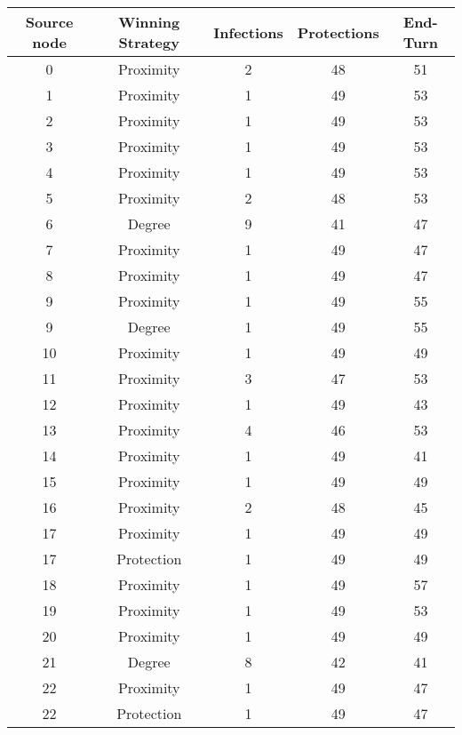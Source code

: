 \documentclass[results.tex]{subfiles}
\begin{document}
\begin{center}
  \begin{tabular}{| c || c | c | c | c |}
    \hline
    {\bfseries Source node} & {\bfseries Winning Strategy} & {\bfseries Infections} & {\bfseries Protections} & {\bfseries End-Turn} \\  %
    \hline\hline
    0 & Proximity & 2 & 48 & 51 \\ 
    \hline
    1 & Proximity & 1 & 49 & 53 \\ 
    \hline
    2 & Proximity & 1 & 49 & 53 \\ 
    \hline
    3 & Proximity & 1 & 49 & 53 \\ 
    \hline
    4 & Proximity & 1 & 49 & 53 \\ 
    \hline
    5 & Proximity & 2 & 48 & 53 \\ 
    \hline
    6 & Degree & 9 & 41 & 47 \\ 
    \hline
    7 & Proximity & 1 & 49 & 47 \\ 
    \hline
    8 & Proximity & 1 & 49 & 47 \\ 
    \hline
    9 & Proximity & 1 & 49 & 55 \\ 
    \hline
    9 & Degree & 1 & 49 & 55 \\ 
    \hline
    10 & Proximity & 1 & 49 & 49 \\ 
    \hline
    11 & Proximity & 3 & 47 & 53 \\ 
    \hline
    12 & Proximity & 1 & 49 & 43 \\ 
    \hline
    13 & Proximity & 4 & 46 & 53 \\ 
    \hline
    14 & Proximity & 1 & 49 & 41 \\ 
    \hline
    15 & Proximity & 1 & 49 & 49 \\ 
    \hline
    16 & Proximity & 2 & 48 & 45 \\ 
    \hline
    17 & Proximity & 1 & 49 & 49 \\ 
    \hline
    17 & Protection & 1 & 49 & 49 \\ 
    \hline
    18 & Proximity & 1 & 49 & 57 \\ 
    \hline
    19 & Proximity & 1 & 49 & 53 \\ 
    \hline
    20 & Proximity & 1 & 49 & 49 \\ 
    \hline
    21 & Degree & 8 & 42 & 41 \\ 
    \hline
    22 & Proximity & 1 & 49 & 47 \\ 
    \hline
    22 & Protection & 1 & 49 & 47 \\ 

\end{tabular}
\end{center}
\end{document}

